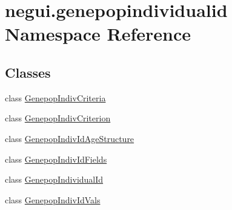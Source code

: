 \hypertarget{namespacenegui_1_1genepopindividualid}{}\section{negui.\+genepopindividualid Namespace Reference}
\label{namespacenegui_1_1genepopindividualid}
\subsection*{Classes}
\begin{DoxyCompactItemize}
\item 
class \hyperlink{classnegui_1_1genepopindividualid_1_1GenepopIndivCriteria}{Genepop\+Indiv\+Criteria}
\item 
class \hyperlink{classnegui_1_1genepopindividualid_1_1GenepopIndivCriterion}{Genepop\+Indiv\+Criterion}
\item 
class \hyperlink{classnegui_1_1genepopindividualid_1_1GenepopIndivIdAgeStructure}{Genepop\+Indiv\+Id\+Age\+Structure}
\item 
class \hyperlink{classnegui_1_1genepopindividualid_1_1GenepopIndivIdFields}{Genepop\+Indiv\+Id\+Fields}
\item 
class \hyperlink{classnegui_1_1genepopindividualid_1_1GenepopIndividualId}{Genepop\+Individual\+Id}
\item 
class \hyperlink{classnegui_1_1genepopindividualid_1_1GenepopIndivIdVals}{Genepop\+Indiv\+Id\+Vals}
\end{DoxyCompactItemize}
